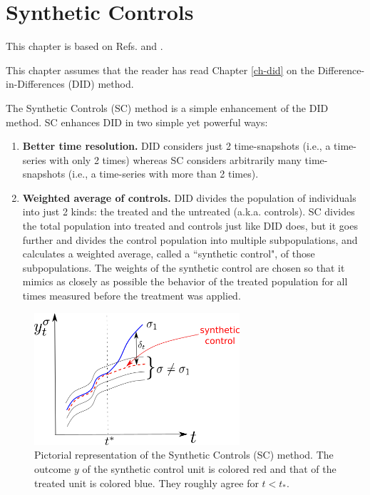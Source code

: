 \chapter{Synthetic Controls}
\label{ch-syn-con}

This chapter is based on Refs.\cite{alves-book}
and \cite{book-mixtape}.

This chapter assumes that
the reader has read Chapter \ref{ch-did}
on the Difference-in-Differences (DID) method.

The Synthetic Controls (SC) method
is a simple enhancement of the DID method.
SC enhances DID in two simple
yet powerful ways:
\begin{enumerate}
\item{\bf Better time resolution.}
DID considers just 2 time-snapshots 
(i.e., a 
time-series with only 2 times)
whereas SC considers
arbitrarily many time-snapshots (i.e., a time-series with
more than 2 times).
\item{\bf Weighted average of controls.}
DID divides the population
of individuals into just 2 kinds:
the treated and the untreated (a.k.a. controls).
SC
divides the 
total population 
into treated and controls
just like DID does, but
it goes further and divides the control population into
multiple subpopulations,
and calculates a weighted average,
called a
``synthetic control",
of those subpopulations.
The weights of the synthetic
control are chosen so that
it mimics as closely as possible
the behavior
of  the treated population for all times
measured before the treatment
was applied.
\end{enumerate}


\begin{figure}[h!]
\centering
\includegraphics[width=3in]
{syn-con/syn-con-p-lines.png}
\caption{Pictorial
representation of the Synthetic Controls (SC) method.
The outcome $y$ of the synthetic control unit
is colored red and that of the treated unit
is colored blue.
They 
roughly agree for $t<t_*$.
} 
\label{fig-syn-con-p-lines}
\end{figure}


